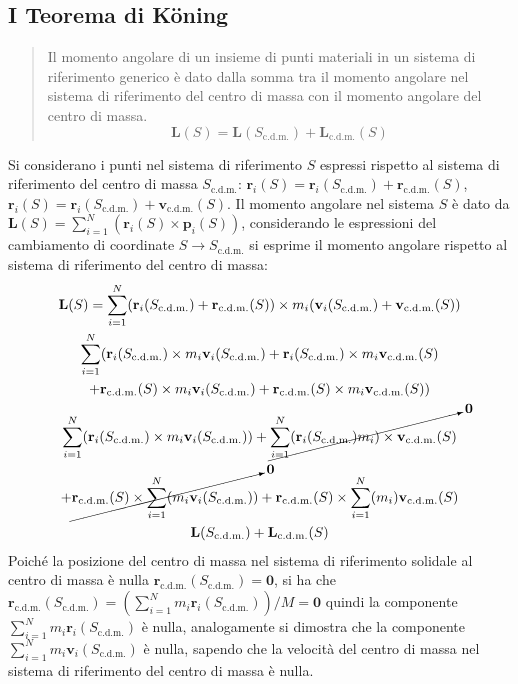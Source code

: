 \documentclass{article}
\newcommand{\vect}[1]{\boldsymbol{\mathbf{#1}}}
\numberwithin{equation}{subsection}
\begin{document}
\subsection{I Teorema di K\"oning}
\begin{quotation}
    Il momento angolare di un insieme di punti materiali in un 
    sistema di riferimento generico è dato dalla somma tra 
    il momento angolare nel sistema di riferimento del centro 
    di massa con il momento angolare del centro di massa.
    \begin{equation}
        \vect{L}(S)=\vect{L}(S_{\mathrm{c.d.m.}})+\vect{L}_{\mathrm{c.d.m.}}(S)
    \end{equation}
\end{quotation}
Si considerano i punti nel sistema di riferimento $S$ espressi rispetto al sistema di riferimento del centro di massa $S_{\mathrm{c.d.m.}}$: $\vect{r}_i(S)=\vect{r}_i(S_{\mathrm{c.d.m.}})+\vect{r}_{\mathrm{c.d.m.}}(S)$, 
$\vect{r}_i(S)=\vect{r}_i(S_{\mathrm{c.d.m.}})+\vect{v}_{\mathrm{c.d.m.}}(S)$.
Il momento angolare nel sistema $S$ è dato da $\vect{L}(S)=\sum_{i=1}^{N}(\vect{r}_i(S)\times\vect{p}_i(S))$, 
considerando le espressioni del cambiamento di coordinate $S\to S_{\mathrm{c.d.m.}}$ si esprime il momento angolare rispetto al sistema di riferimento del centro di massa: 
\begin{gather*}
    \vect{L}(S)=\displaystyle\sum_{i=1}^{N}(\vect{r}_i(S_{\mathrm{c.d.m.}})+\vect{r}_{\mathrm{c.d.m.}}(S))\times m_i(\vect{v}_i(S_{\mathrm{c.d.m.}})+\vect{v}_{\mathrm{c.d.m.}}(S))\\
    \displaystyle\sum_{i=1}^{N}(\vect{r}_i(S_{\mathrm{c.d.m.}})\times m_i\vect{v}_i(S_{\mathrm{c.d.m.}})+\vect{r}_i(S_{\mathrm{c.d.m.}})\times m_i\vect{v}_{\mathrm{c.d.m.}}(S)\\
    +\vect{r}_{\mathrm{c.d.m.}}(S)\times m_i\vect{v}_i(S_{\mathrm{c.d.m.}})+\vect{r}_{\mathrm{c.d.m.}}(S)\times m_i\vect{v}_{\mathrm{c.d.m.}}(S))\\
    \displaystyle\sum_{i=1}^{N}(\vect{r}_i(S_{\mathrm{c.d.m.}})\times m_i\vect{v}_i(S_{\mathrm{c.d.m.}}))+\cancelto{\vect0}{\sum_{i=1}^{N}(\vect{r}_i(S_{\mathrm{c.d.m.}})m_i)\times \vect{v}_{\mathrm{c.d.m.}}(S)}\\
    +\cancelto{\vect0}{\vect{r}_{\mathrm{c.d.m.}}(S)\times\sum_{i=1}^{N}(m_i\vect{v}_i(S_{\mathrm{c.d.m.}}))}+\vect{r}_{\mathrm{c.d.m.}}(S)\times\sum_{i=1}^{N}(m_i)\vect{v}_{\mathrm{c.d.m.}}(S)\\
    \vect{L}(S_{\mathrm{c.d.m.}})+\vect{L}_{\mathrm{c.d.m.}}(S)
\end{gather*}
Poiché la posizione del centro di massa nel sistema di riferimento solidale al centro di massa è nulla $\vect{r}_{\mathrm{c.d.m.}}(S_{\mathrm{c.d.m.}})=\vect{0}$, 
si ha che $\vect{r}_{\mathrm{c.d.m.}}(S_{\mathrm{c.d.m.}})=\left({\sum_{i=1}^{N}m_i\vect{r}_i(S_{\mathrm{c.d.m.}})}\right)/{M}=\vect{0}$ 
quindi la componente $\sum_{i=1}^{N}m_i\vect{r}_i(S_{\mathrm{c.d.m.}})$ è nulla, analogamente si dimostra che la componente $\sum_{i=1}^{N}m_i\vect{v}_i(S_{\mathrm{c.d.m.}})$ è nulla, sapendo 
che la velocità del centro di massa nel sistema di riferimento del centro di massa è nulla.
\end{document}
